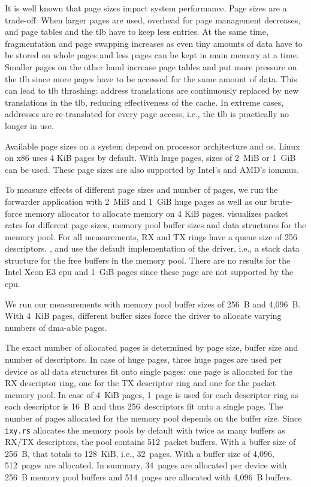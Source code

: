 It is well known that page sizes impact system performance. Page sizes are a
trade-off: When larger pages are used, overhead for page management decreases,
and page tables and the \ac{tlb} have to keep less entries. At the same time,
fragmentation and page swapping increases as even tiny amounts of data have to
be stored on whole pages and less pages can be kept in main memory at a time.
Smaller pages on the other hand increase page tables and put more pressure on
the \ac{tlb} since more pages have to be accessed for the same amount of data.
This can lead to \ac{tlb} thrashing: address translations are continuously
replaced by new translations in the \ac{tlb}, reducing effectiveness of the
cache. In extreme cases, addresses are re-translated for every page access,
i.e., the \ac{tlb} is practically no longer in use.

Available page sizes on a system depend on processor architecture and \ac{os}.
Linux on x86 uses 4 KiB pages by default. With huge pages, sizes of 2~MiB or
1~GiB can be used. These page sizes are also supported by Intel's and AMD's
\acp{iommu}.

To measure effects of different page sizes and number of pages, we run the
forwarder application with 2~MiB and 1~GiB huge pages as well as our brute-force
memory allocator to allocate memory on 4 KiB pages.
 visualizes packet rates for different page
sizes, memory pool buffer sizes and data structures for the memory pool. For all
measurements, RX and TX rings have a queue size of 256 descriptors.
,  and
 use the default implementation of the driver,
i.e., a stack data structure for the free buffers in the memory pool. There are
no results for the Intel Xeon E3 \ac{cpu} and 1~GiB pages since these page are
not supported by the \ac{cpu}.

We run our measurements with memory pool buffer sizes of 256~B and 4,096~B. With
4~KiB pages, different buffer sizes force the driver to allocate varying numbers
of \ac{dma}-able pages.

The exact number of allocated pages is determined by page size, buffer size and
number of descriptors. In case of huge pages, three huge pages are used per
device as all data structures fit onto single pages: one page is allocated for
the RX descriptor ring, one for the TX descriptor ring and one for the packet
memory pool. In case of 4~KiB pages, 1~page is used for each descriptor ring as
each descriptor is 16~B and thus 256~descriptors fit onto a single page. The
number of pages allocated for the memory pool depends on the buffer size. Since
\texttt{ixy.rs} allocates the memory pools by default with twice as many buffers
as RX/TX descriptors, the pool contains 512~packet buffers. With a buffer size
of 256~B, that totals to 128~KiB, i.e., 32~pages. With a buffer size of 4,096,
512~pages are allocated. In summary, 34~pages are allocated per device with
256~B memory pool buffers and 514~pages are allocated with 4,096~B buffers.

